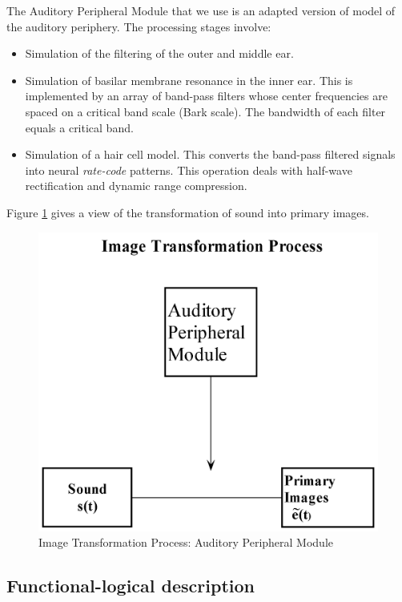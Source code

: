 The Auditory Peripheral Module that we use is an adapted version
of  model of the auditory periphery.
The processing stages involve:
\begin{itemize}
\item
    Simulation of the filtering of the outer and middle ear.
\item
    Simulation of basilar membrane resonance in the inner ear. This is
    implemented by an array of band-pass filters whose center
    frequencies are spaced on a critical band scale (Bark scale).
    The bandwidth of each filter equals
    a critical band.
\item
    Simulation of a hair cell model. This converts the band-pass filtered signals into
    neural {\sl rate-code} patterns. This operation deals with half-wave rectification and
    dynamic range compression.
\end{itemize}

Figure \ref{Fig:APMModule} gives a view of the transformation of
sound into primary images.
\begin{figure}[h]
    \centering
    \includegraphics[width=\IPEMDefaultFigureWidth]{Graphics/APMModule}
    \caption{Image Transformation Process: Auditory Peripheral  Module}
    \label{Fig:APMModule}
\end{figure}

\subsection{Functional-logical description}

